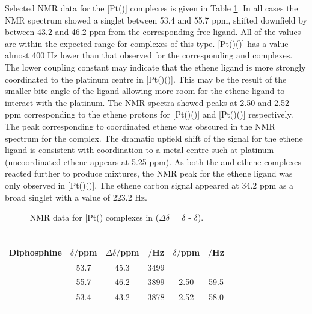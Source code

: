Selected NMR data for the [Pt(\tBuxantphos)] complexes is given in Table \ref{table:PtEtNMR}.  In all cases the \phosphorus{} NMR spectrum showed a singlet between 53.4 and 55.7 ppm, shifted downfield by between 43.2 and 46.2 ppm from the corresponding free ligand.  All of the \JPtP{} values are within the expected range for complexes of this type.\cite{Pregosin2012}  [Pt(\tBusixantphos{})()] has a \JPtP{} value almost 400 Hz lower than that observed for the corresponding \tButhixantphos{} and \tBuxantphos{} complexes.    The lower coupling constant may indicate that the ethene ligand is more strongly coordinated to the platinum centre in [Pt(\tBusixantphos{})()].  This may be the result of the smaller bite-angle of the \tBusixantphos{} ligand allowing more room for the ethene ligand to interact with the platinum.  The \proton{} NMR spectra showed peaks at 2.50 and 2.52 ppm corresponding to the ethene protons for [Pt(\tButhixantphos{})()] and [Pt(\tBuxantphos{})()] respectively.   The peak corresponding to coordinated ethene was obscured in the \proton{} NMR spectrum for the \tBusixantphos{} complex.  The dramatic upfield shift of the \proton{} signal for the ethene ligand is consistent with coordination to a metal centre such at platinum (uncoordinated ethene appears at 5.25 ppm\cite{Fulmer2010}).  As both the \tBusixantphos{} and \tBuxantphos{} ethene complexes reacted further to produce mixtures, the \carbon{} NMR peak for the ethene ligand was only observed in [Pt(\tButhixantphos{})()].  The ethene carbon signal appeared at 34.2 ppm as a broad singlet with a \JPtC{} value of 223.2 Hz.

\begin{table}[htbp]
\caption[\phosphorus{} NMR data for [Pt(\tBuxantphos)\ce{(C2H4)}{]} complexes]{\phosphorus{} NMR data for [Pt(\tBuxantphos)\ce{(C2H4)}{]} complexes in  ($\Delta\delta$ = $\delta$ - $\delta$).}
\vspace{1em}
\label{table:PtEtNMR}
\small
\begin{center}
\begin{tabular}{l c c c c c}
\toprule{}
	~~ & \multicolumn{3}{c}{\bfseries{\phosphorus}} & \multicolumn{2}{c}{\bfseries{\proton}}\\
	\cmidrule(lr){2-4} \cmidrule(lr){5-6}
	\bfseries{Diphosphine}&\bfseries{$\delta/$ppm}&\bfseries{$\Delta\delta/$ppm}&\bfseries{\JPtP $/$Hz} & \bfseries{$\delta/$ppm} & \bfseries{\JPtH $/$Hz} \\
	\midrule
	\tBuSixantphos 		& 53.7 & 45.3 & 3499 & & \\
	\tBuThixantphos 	& 55.7 & 46.2 & 3899 & 2.50 & 59.5 \\
	\tBuXantphos		& 53.4 & 43.2 & 3878 & 2.52 & 58.0 \\
	\bottomrule{}
\end{tabular}
\end{center}
\end{table}

